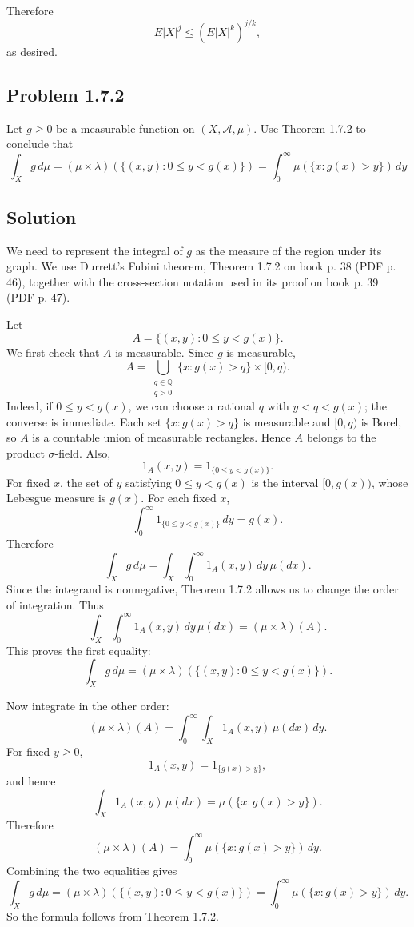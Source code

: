 \documentclass[a4paper,12pt,openany]{article}
\theoremstyle{plain}
\theoremstyle{definition}
\begin{document}
\medskip

Therefore
\[
E|X|^j \le (E|X|^k)^{j/k},
\]
as desired.

\subsection*{Problem 1.7.2}

Let $g \ge 0$ be a measurable function on $(X, \mathcal{A}, \mu)$. Use Theorem 1.7.2 to conclude that
\[
\int_X g\,d\mu
= (\mu \times \lambda)(\{(x,y) : 0 \le y < g(x)\})
= \int_0^\infty \mu(\{x : g(x) > y\})\,dy
\]

\subsection*{Solution}

We need to represent the integral of $g$ as the measure of the region under its graph. We use Durrett's Fubini theorem, Theorem 1.7.2 on book p. 38 (PDF p. 46), together with the cross-section notation used in its proof on book p. 39 (PDF p. 47).

\medskip

Let
\[
A=\{(x,y):0\le y<g(x)\}.
\]
We first check that $A$ is measurable. Since $g$ is measurable,
\[
A
=
\bigcup_{\substack{q\in\mathbb{Q}\\ q>0}}
\{x:g(x)>q\}\times [0,q).
\]
Indeed, if $0\le y<g(x)$, we can choose a rational $q$ with $y<q<g(x)$; the converse is immediate. Each set $\{x:g(x)>q\}$ is measurable and $[0,q)$ is Borel, so $A$ is a countable union of measurable rectangles. Hence $A$ belongs to the product $\sigma$-field. Also,
\[
1_A(x,y)=1_{\{0\le y<g(x)\}}.
\]
For fixed $x$, the set of $y$ satisfying $0\le y<g(x)$ is the interval $[0,g(x))$, whose Lebesgue measure is $g(x)$.
For each fixed $x$,
\[
\int_0^\infty 1_{\{0\le y<g(x)\}}\,dy
=
g(x).
\]
Therefore
\[
\int_X g\,d\mu
=
\int_X\int_0^\infty 1_A(x,y)\,dy\,\mu(dx).
\]
Since the integrand is nonnegative, Theorem 1.7.2 allows us to change the order of integration. Thus
\[
\int_X\int_0^\infty 1_A(x,y)\,dy\,\mu(dx)
=
(\mu\times\lambda)(A).
\]
This proves the first equality:
\[
\int_X g\,d\mu
=
(\mu\times\lambda)(\{(x,y):0\le y<g(x)\}).
\]

\medskip

Now integrate in the other order:
\[
(\mu\times\lambda)(A)
=
\int_0^\infty\int_X 1_A(x,y)\,\mu(dx)\,dy.
\]
For fixed $y\ge 0$,
\[
1_A(x,y)=1_{\{g(x)>y\}},
\]
and hence
\[
\int_X 1_A(x,y)\,\mu(dx)
=
\mu(\{x:g(x)>y\}).
\]
Therefore
\[
(\mu\times\lambda)(A)
=
\int_0^\infty \mu(\{x:g(x)>y\})\,dy.
\]
Combining the two equalities gives
\[
\int_X g\,d\mu
=
(\mu \times \lambda)(\{(x,y) : 0 \le y < g(x)\})
=
\int_0^\infty \mu(\{x : g(x) > y\})\,dy.
\]
So the formula follows from Theorem 1.7.2.
\end{document}
